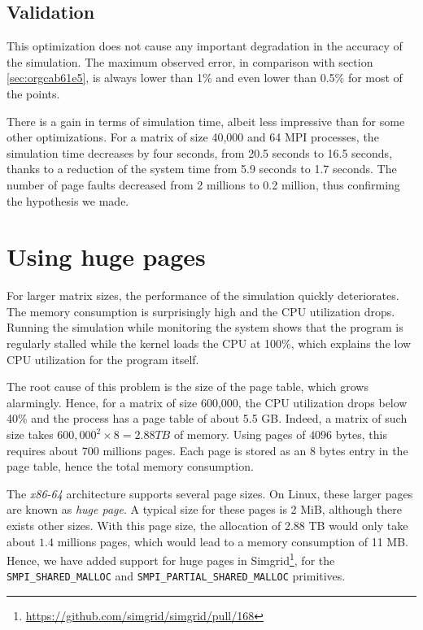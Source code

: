 \documentclass[12pt, a4paper]{memoir}
\begin{document}
\subsection{Validation}
\label{sec:org0dd5205}
This optimization does not cause any important degradation in the accuracy of the simulation. The maximum observed
error, in comparison with section \ref{sec:orgcab61e5}, is always lower than 1\% and even lower than 0.5\% for
most of the points.

There is a gain in terms of simulation time, albeit less impressive than for some other optimizations. For a matrix
of size 40,000 and 64 MPI processes, the simulation time decreases by four seconds, from 20.5 seconds to 16.5
seconds, thanks to a reduction of the system time from 5.9 seconds to 1.7 seconds. The number of page faults
decreased from 2 millions to 0.2 million, thus confirming the hypothesis we made.
\section{Using huge pages}
\label{sec:org9ff616d}
For larger matrix sizes, the performance of the simulation quickly deteriorates. The memory consumption is
surprisingly high and the CPU utilization drops. Running the simulation while monitoring the system shows that the
program is regularly stalled while the kernel loads the CPU at 100\%, which explains the low CPU utilization for the
program itself.

The root cause of this problem is the size of the page table, which grows alarmingly. Hence, for a matrix of size
600,000, the CPU utilization drops below 40\% and the process has a page table of about 5.5 GB. Indeed, a matrix of
such size takes \(600,000^2 \times 8 = 2.88 TB\) of memory. Using pages of \(4096\) bytes, this requires about \(700\) millions
pages. Each page is stored as an 8 bytes entry in the page table, hence the total memory consumption.

The \emph{x86-64} architecture supports several page sizes. On Linux, these larger pages are known as \emph{huge page}. A typical
size for these pages is 2 MiB, although there exists other sizes. With this page size, the allocation of 2.88 TB
would only take about \(1.4\) millions pages, which would lead to a memory consumption of 11 MB. Hence, we have added
support for huge pages in Simgrid\footnote{\url{https://github.com/simgrid/simgrid/pull/168}}, for the \texttt{SMPI\_SHARED\_MALLOC} and \texttt{SMPI\_PARTIAL\_SHARED\_MALLOC}
primitives.
\end{document}
